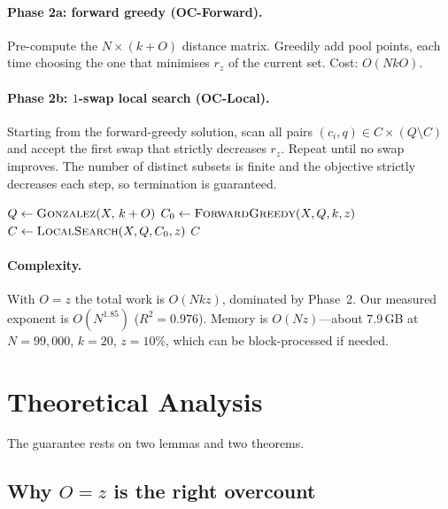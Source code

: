 \documentclass{siam}
\newcommand{\rz}{r_z}
\begin{document}
\paragraph{Phase 2a: forward greedy (OC-Forward).}
Pre-compute the $N\times(k{+}O)$ distance matrix. Greedily add pool
points, each time choosing the one that minimises $\rz$ of the current
set. Cost: $O(NkO)$.

\paragraph{Phase 2b: $1$-swap local search (OC-Local).}
Starting from the forward-greedy solution, scan all pairs
$(c_i, q)\in C\times(Q\setminus C)$ and accept the first swap that
strictly decreases $\rz$. Repeat until no swap improves. The number of
distinct subsets is finite and the objective strictly decreases each
step, so termination is guaranteed.

\begin{algorithm}[t]
\caption{OverclusterDRG$(X, k, z, O{=}z)$}
\label{alg:main}
\begin{algorithmic}[1]
\State $Q \gets \textsc{Gonzalez}(X,\, k+O)$
\State $C_0 \gets \textsc{ForwardGreedy}(X, Q, k, z)$
\State $C \gets \textsc{LocalSearch}(X, Q, C_0, z)$
\State \Return $C$
\end{algorithmic}
\end{algorithm}

\paragraph{Complexity.}
With $O=z$ the total work is $O(Nkz)$, dominated by Phase~2. Our
measured exponent is $O(N^{1.85})$ ($R^2=0.976$). Memory is
$O(Nz)$---about $7.9$\,GB at $N=99{,}000$, $k=20$, $z=10\%$, which can
be block-processed if needed.

\section{Theoretical Analysis}
\label{sec:theory}

The guarantee rests on two lemmas and two theorems.

\subsection{Why $O = z$ is the right overcount}
\end{document}

